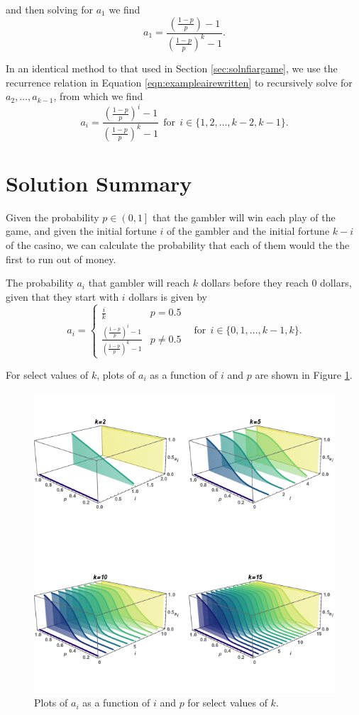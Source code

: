 \documentclass[a4paper,11pt]{article}
\begin{document}
and then solving for $a_1$ we find
\begin{equation}
a_1 = \frac{ \left(\frac{1-p}{p}\right) - 1 }{ \left(\frac{1-p}{p}\right)^k - 1 }.
\end{equation}

In an identical method to that used in Section \ref{sec:solnfiargame}, we use the recurrence relation in Equation \ref{eqn:exampleairewritten} to recursively solve for $a_2, \ldots, a_{k-1}$, from which we find
\begin{equation}
a_i = \frac{ \left(\frac{1-p}{p}\right)^i - 1 }{ \left(\frac{1-p}{p}\right)^k - 1 } \ \ \mathrm{for} \ \ i \in \{ 1, 2, \ldots, k-2, k-1 \}.
\end{equation}

\section{Solution Summary}

Given the probability $p\in\left(0,1\right]$ that the gambler will win each play of the game, and given the initial fortune $i$ of the gambler and the initial fortune $k-i$ of the casino, we can calculate the probability that each of them would the the first to run out of money.

The probability $a_i$ that gambler will reach $k$ dollars before they reach 0 dollars, given that they start with $i$ dollars is given by
\begin{equation}
a_i =
\begin{cases}
\frac{i}{k} & p=0.5\\
\frac{ \left(\frac{1-p}{p}\right)^i - 1 }{ \left(\frac{1-p}{p}\right)^k - 1 } & p\neq0.5
\end{cases} \ \ \ \ \mathrm{for} \ \ i \in \{ 0, 1, \ldots, k-1, k \}.
\end{equation}

For select values of $k$, plots of $a_i$ as a function of $i$ and $p$ are shown in Figure \ref{fig:ai_vs_i_p}.
\begin{figure}
\centering
\includegraphics[width=1\textwidth]{plots.png}
\caption{\label{fig:ai_vs_i_p}Plots of $a_i$ as a function of $i$ and $p$ for select values of $k$.}
\end{figure}
\end{document}
